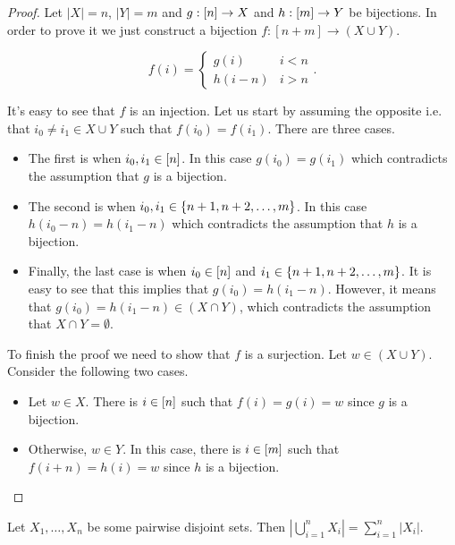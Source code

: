 \begin{proof}
  Let $|X| = n$, $|Y| = m$ and $g : {[{n}]} \to X$ and $h : {[{m}]} \to Y$ be
  bijections. In order to prove it we just construct a bijection
  $f : [n + m] \to (X \cup Y)$.

  \[
    f(i) =
    \begin{cases}
        g(i) & i < n \\
        h(i  - n) & i > n
    \end{cases}.
  \]

  It's easy to see that $f$ is an injection. Let us start by assuming the opposite i.e.
  that $i_0 \neq i_1 \in X \cup Y$ such that $f(i_0) = f(i_1)$.
  There are three cases.
  \begin{itemize}
    \item The first is when $i_0, i_1 \in {[{n}]}$. In this case $g(i_0) = g(i_1)$
      which contradicts the assumption that $g$ is a bijection.
    \item The second is when $i_0, i_1 \in \set{n + 1, n + 2, \dots, m}$.
      In this case $h(i_0 - n) = h(i_1 - n)$ which contradicts the assumption
      that $h$ is a bijection.
    \item Finally, the last case is when $i_0 \in {[{n}]}$ and
      $i_1 \in \set{n + 1, n + 2, \dots, m}$. It is easy to see that this
      implies that $g(i_0) = h(i_1 - n)$. However, it
      means that $g(i_0) = h(i_1 - n) \in (X \cap Y)$, which contradicts the
      assumption that $X \cap Y = \emptyset$.
  \end{itemize}

  To finish the proof we need to show that $f$ is a surjection. Let
  $w \in (X \cup Y)$. Consider the following two cases.
  \begin{itemize}
    \item Let $w \in X$. There is $i \in {[{n}]}$ such that $f(i) = g(i) = w$ since
      $g$ is a bijection.
    \item Otherwise, $w \in Y$. In this case, there is $i \in {[{m}]}$ such that
      $f(i + n) = h(i) = w$ since $h$ is a bijection.
  \end{itemize}
\end{proof}

\begin{corollary}
\label{corollary:additive-principle}
  Let $X_1, \dots, X_n$ be some pairwise disjoint sets. Then
  $\left|\bigcup_{i = 1}^n X_i\right| = \sum_{i = 1}^n |X_i|$.
\end{corollary}

